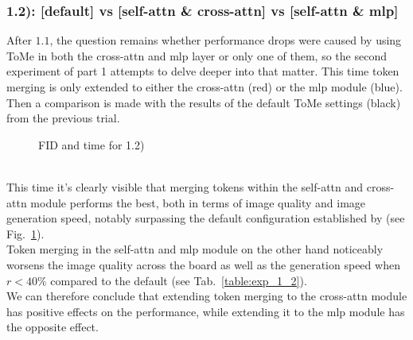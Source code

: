 \subsubsection*{1.2): [default] vs [self-attn \& cross-attn] vs [self-attn \& mlp]}
After \(1.1\), the question remains whether performance drops were caused by using ToMe in both the cross-attn and mlp layer or only one of them, so the second experiment of part 1 attempts to delve deeper into that matter. This time token merging is only extended to either the cross-attn (red) or the mlp module (blue). Then a comparison is made with the results of the default ToMe settings (black) from the previous trial.
\begin{figure}[!htb]
    
    
\caption{FID and time for 1.2)}
\label{fig:exp_1_2}
\end{figure}\\
\newpage
This time it's clearly visible that merging tokens within the self-attn and cross-attn module performs the best, both in terms of image quality and image generation speed, notably surpassing the default configuration established by \cite{bolya2023tomesd} (see Fig.~\ref{fig:exp_1_2}).\\
Token merging in the self-attn and mlp module on the other hand noticeably worsens the image quality across the board as well as the generation speed when $r<40\%$ compared to the default (see Tab.~\ref{table:exp_1_2}).\\
We can therefore conclude that extending token merging to the cross-attn module has positive effects on the performance, while extending it to the mlp module has the opposite effect.



